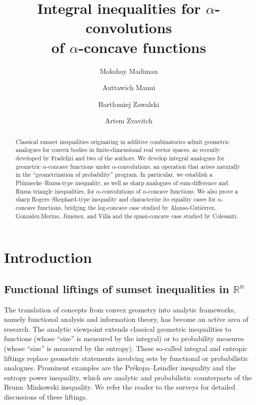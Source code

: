 \documentclass[11pt]{amsart}
\title[On $\alpha$-convolutions]{Integral inequalities for $\alpha$-convolutions\\of $\alpha$-concave functions}
\author[M. Madiman]{Mokshay Madiman}
\author[A. Manui]{Auttawich Manui}
\author[B. Zawalski]{Bart\l{}omiej Zawalski}
\author[A. Zvavitch]{Artem Zvavitch}
\newcommand{\R}{{\mathbb R}}
\theoremstyle{plain}
\theoremstyle{definition}
\theoremstyle{remark}
\begin{document}
\begin{abstract}
Classical sumset inequalities originating in additive combinatorics admit geometric analogues for convex bodies in finite-dimensional real vector spaces, as recently developed by Fradelizi and two of the authors. We develop integral analogues for geometric $\alpha$-concave functions under $\alpha$-convolutions, an operation that arises naturally in the ``geometrization of probability'' program. In particular, we establish a Pl\"unnecke--Ruzsa-type inequality, as well as sharp analogues of sum-difference and Ruzsa triangle inequalities,  for $\alpha$-convolutions of $\alpha$-concave functions. We also prove a sharp Rogers--Shephard-type inequality and characterize its equality cases for $\alpha$-concave functions, bridging the log-concave case studied by Alonso-Guti\'errez, Gonz\'alez-Merino, Jim\'enez, and Villa and the quasi-concave case studied by Colesanti.
\end{abstract}

\maketitle


\section{Introduction}


\subsection{Functional liftings of sumset inequalities 
in \texorpdfstring{$\R^n$}{Rn}}


The translation of concepts from convex geometry into analytic frameworks, namely functional analysis and information theory, has become an active area of research. The analytic viewpoint extends classical geometric inequalities to functions (whose ``size'' is measured by the integral) or to probability measures (whose ``size'' is measured by the entropy). These so-called integral and entropic liftings replace geometric statements involving sets by functional or probabilistic analogues. Prominent examples are the Pr\'ekopa--Leindler inequality and the entropy power inequality, which are analytic and probabilistic counterparts of the Brunn--Minkowski inequality. We refer the reader to the surveys  \cite{G-02,Mi-08, S-14, MMX-17, Col17} for detailed discussions of these liftings.
\end{document}
